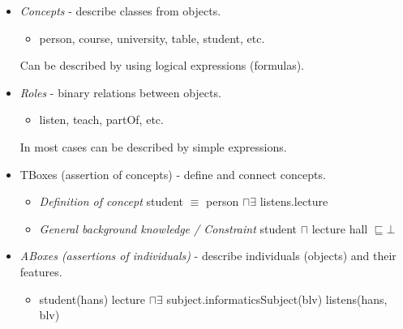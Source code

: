 \begin{itemize}
    \item \textit{Concepts} - describe classes from objects.
    \begin{itemize}
        \item person, course, university, table, student, etc.
    \end{itemize}
     Can be described by using logical expressions (formulas).
    \item \textit{Roles} - binary relations between objects.
    \begin{itemize}
        \item listen, teach, partOf, etc.
    \end{itemize}
    In most cases can be described by simple expressions. 
    \item TBoxes (assertion of concepts) - define and connect concepts.
    \begin{itemize}
        \item \textit{Definition of concept}\newline 
        student $\equiv$ person $\sqcap \exists$ listens.lecture  
        \item \textit{General background knowledge / Constraint}\newline
        student $\sqcap$ lecture hall $\sqsubseteq \bot$
    \end{itemize}
    \item \textit{ABoxes (assertions of individuals)} - describe individuals (objects) and their features.
        \begin{itemize}
            \item student(hans)\newline
            lecture $\sqcap \exists$ subject.informaticsSubject(blv)\newline
            listens(hans, blv)
        \end{itemize}
\end{itemize}

